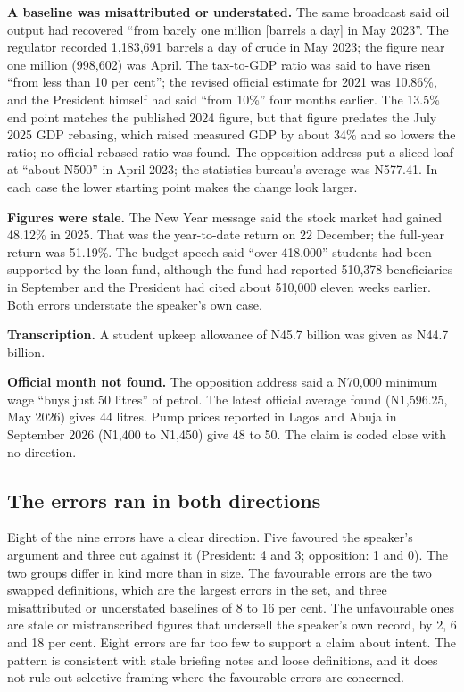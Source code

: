 \documentclass[11pt]{article}
\newcommand{\N}{N}
\begin{document}
\textbf{A baseline was misattributed or understated.} The same broadcast said oil output had recovered ``from barely one million [barrels a day] in May 2023''. The regulator recorded 1,183,691 barrels a day of crude in May 2023; the figure near one million (998,602) was April. The tax-to-GDP ratio was said to have risen ``from less than 10 per cent''; the revised official estimate for 2021 was 10.86\%, and the President himself had said ``from 10\%'' four months earlier. The 13.5\% end point matches the published 2024 figure, but that figure predates the July 2025 GDP rebasing, which raised measured GDP by about 34\% and so lowers the ratio; no official rebased ratio was found. The opposition address put a sliced loaf at ``about \N 500'' in April 2023; the statistics bureau's average was \N 577.41. In each case the lower starting point makes the change look larger.

\textbf{Figures were stale.} The New Year message said the stock market had gained 48.12\% in 2025. That was the year-to-date return on 22 December; the full-year return was 51.19\%. The budget speech said ``over 418,000'' students had been supported by the loan fund, although the fund had reported 510,378 beneficiaries in September and the President had cited about 510,000 eleven weeks earlier. Both errors understate the speaker's own case.

\textbf{Transcription.} A student upkeep allowance of \N 45.7 billion was given as \N 44.7 billion.

\textbf{Official month not found.} The opposition address said a \N 70,000 minimum wage ``buys just 50 litres'' of petrol. The latest official average found (\N 1,596.25, May 2026) gives 44 litres. Pump prices reported in Lagos and Abuja in September 2026 (\N 1,400 to \N 1,450) give 48 to 50. The claim is coded close with no direction.

\subsection{The errors ran in both directions}
\label{sec:both}

Eight of the nine errors have a clear direction. Five favoured the speaker's argument and three cut against it (President: 4 and 3; opposition: 1 and 0). The two groups differ in kind more than in size. The favourable errors are the two swapped definitions, which are the largest errors in the set, and three misattributed or understated baselines of 8 to 16 per cent. The unfavourable ones are stale or mistranscribed figures that undersell the speaker's own record, by 2, 6 and 18 per cent. Eight errors are far too few to support a claim about intent. The pattern is consistent with stale briefing notes and loose definitions, and it does not rule out selective framing where the favourable errors are concerned.
\end{document}
